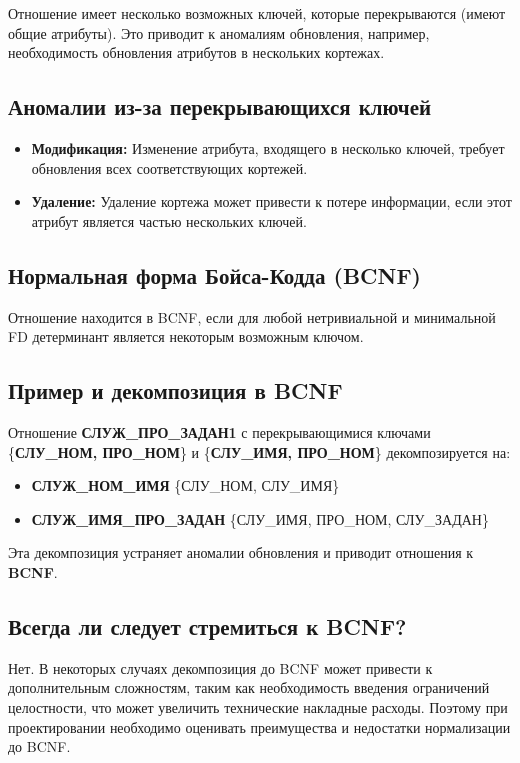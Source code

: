 \documentclass[a4paper,12pt]{article}
\begin{document}
Отношение имеет несколько возможных ключей, которые перекрываются (имеют общие атрибуты). Это приводит к аномалиям обновления, например, необходимость обновления атрибутов в нескольких кортежах.

\subsection{Аномалии из-за перекрывающихся ключей}

\begin{itemize}
    \item \textbf{Модификация:} Изменение атрибута, входящего в несколько ключей, требует обновления всех соответствующих кортежей.
    \item \textbf{Удаление:} Удаление кортежа может привести к потере информации, если этот атрибут является частью нескольких ключей.
\end{itemize}

\subsection{Нормальная форма Бойса-Кодда (BCNF)}

Отношение находится в BCNF, если для любой нетривиальной и минимальной FD детерминант является некоторым возможным ключом.

\subsection{Пример и декомпозиция в BCNF}

Отношение \textbf{СЛУЖ\_ПРО\_ЗАДАН1} с перекрывающимися ключами \{\textbf{СЛУ\_НОМ, ПРО\_НОМ}\} и \{\textbf{СЛУ\_ИМЯ, ПРО\_НОМ}\} декомпозируется на:
\begin{itemize}
    \item \textbf{СЛУЖ\_НОМ\_ИМЯ} \{СЛУ\_НОМ, СЛУ\_ИМЯ\}
    \item \textbf{СЛУЖ\_ИМЯ\_ПРО\_ЗАДАН} \{СЛУ\_ИМЯ, ПРО\_НОМ, СЛУ\_ЗАДАН\}
\end{itemize}
Эта декомпозиция устраняет аномалии обновления и приводит отношения к \textbf{BCNF}.

\subsection{Всегда ли следует стремиться к BCNF?}

Нет. В некоторых случаях декомпозиция до BCNF может привести к дополнительным сложностям, таким как необходимость введения ограничений целостности, что может увеличить технические накладные расходы. Поэтому при проектировании необходимо оценивать преимущества и недостатки нормализации до BCNF.
\end{document}
